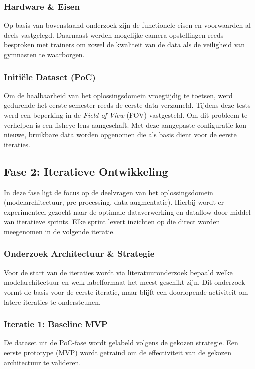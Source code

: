 \subsubsection{Hardware \& Eisen}
Op basis van bovenstaand onderzoek zijn de functionele eisen en voorwaarden al deels vastgelegd. Daarnaast werden mogelijke camera-opstellingen reeds besproken met trainers om zowel de kwaliteit van de data als de veiligheid van gymnasten te waarborgen.

\subsubsection{Initi{\"e}le Dataset (PoC)}
Om de haalbaarheid van het oplossingsdomein vroegtijdig te toetsen, werd gedurende het eerste semester reeds de eerste data verzameld. Tijdens deze tests werd een beperking in de \textit{Field of View} (FOV) vastgesteld. Om dit probleem te verhelpen is een fisheye-lens aangeschaft. Met deze aangepaste configuratie kon nieuwe, bruikbare data worden opgenomen die als basis dient voor de eerste iteraties.

\subsection{Fase 2: Iteratieve Ontwikkeling}
In deze fase ligt de focus op de deelvragen van het oplossingsdomein (modelarchitectuur, pre-processing, data-augmentatie). Hierbij wordt er experimenteel gezocht naar de optimale dataverwerking en dataflow door middel van iteratieve sprints. Elke sprint levert inzichten op die direct worden meegenomen in de volgende iteratie.

\subsubsection{Onderzoek Architectuur \& Strategie}
Voor de start van de iteraties wordt via literatuuronderzoek bepaald welke modelarchitectuur en welk labelformaat het meest geschikt zijn. Dit onderzoek vormt de basis voor de eerste iteratie, maar blijft een doorlopende activiteit om latere iteraties te ondersteunen.

\subsubsection{Iteratie 1: Baseline MVP}
De dataset uit de PoC-fase wordt gelabeld volgens de gekozen strategie. Een eerste prototype (MVP) wordt getraind om de effectiviteit van de gekozen architectuur te valideren.

